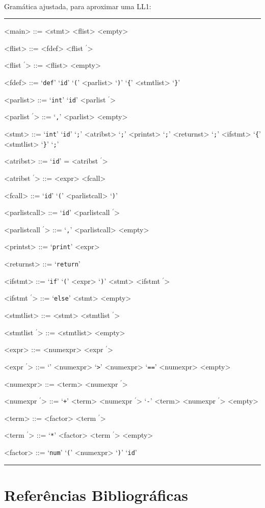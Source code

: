 \documentclass[12pt]{article}
\newcommand{\pprime}{\ensuremath{^{\prime}}}
\begin{document}
\paragraph{}
Gramática ajustada, para aproximar uma LL1:

\noindent\rule{\textwidth}{0.2pt}

\begin{multicols}{2}
\raggedcolumns
\setlength{\columnseprule}{0.2pt}
\begin{grammar}
<main> ::= <stmt> 
  \alt <flist> 
  \alt <empty>

<flist> ::= <fdef> <flist \pprime>

<flist \pprime> ::= <flist> 
  \alt <empty>

<fdef> ::= ‘\texttt{def}’ ‘\texttt{id}’ ‘\texttt{(}’ <parlist> ‘\texttt{)}’ ‘\texttt{\{}’ <stmtlist> ‘\texttt{\}}’

<parlist> ::= ‘\texttt{int}’ ‘\texttt{id}’ <parlist \pprime>

<parlist \pprime> ::= ‘\texttt{,}’ <parlist> 
  \alt <empty>

<stmt> ::= ‘\texttt{int}’ ‘\texttt{id}’ ‘\texttt{;}’
  \alt <atribst> ‘\texttt{;}’
  \alt <printst> ‘\texttt{;}’
  \alt <returnst> ‘\texttt{;}’
  \alt <ifstmt>
  \alt ‘\texttt{\{}’ <stmtlist> ‘\texttt{\}}’
  \alt ‘\texttt{;}’

<atribst> ::= ‘\texttt{id}’ = <atribst \pprime>

<atribst \pprime> ::= <expr> 
  \alt <fcall>

<fcall> ::= ‘\texttt{id}’ ‘\texttt{(}’ <parlistcall> ‘\texttt{)}’

<parlistcall> ::= ‘\texttt{id}’ <parlistcall \pprime>

<parlistcall \pprime> ::= ‘\texttt{,}’ <parlistcall> 
  \alt <empty>

<printst> ::= ‘\texttt{print}’ <expr>

<returnst> ::= ‘\texttt{return}’

<ifstmt> ::= ‘\texttt{if}’ ‘\texttt{(}’ <expr> ‘\texttt{)}’ <stmt> <ifstmt \pprime>

<ifstmt \pprime> ::= ‘\texttt{else}’ <stmt> 
  \alt <empty>

<stmtlist> ::= <stmt> <stmtlist \pprime>

<stmtlist \pprime> ::= <stmtlist> 
  \alt <empty>

<expr> ::= <numexpr> <expr \pprime>

<expr \pprime> ::= ‘\texttt{}’ <numexpr>
  \alt ‘\texttt{>}’ <numexpr>
  \alt ‘\texttt{==}’ <numexpr>
  \alt <empty>

<numexpr> ::= <term> <numexpr \pprime>

<numexpr \pprime> ::= ‘\texttt{+}’ <term> <numexpr \pprime>
  \alt ‘\texttt{-}’ <term> <numexpr \pprime>
  \alt <empty>

<term> ::= <factor> <term \pprime>

<term \pprime> ::= ‘\texttt{*}’ <factor> <term \pprime>
  \alt <empty>

<factor> ::= ‘\texttt{num}’
  \alt ‘\texttt{(}’ <numexpr> ‘\texttt{)}’
  \alt ‘\texttt{id}’
\end{grammar}
\end{multicols}

\noindent\rule{\textwidth}{0.2pt}

\newpage
\section{Referências Bibliográficas}


\end{document}
